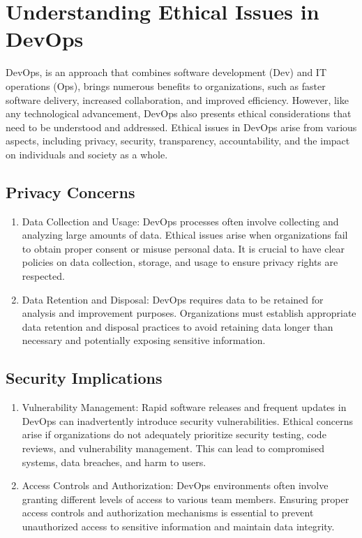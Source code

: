 \chapter*{Understanding Ethical Issues in DevOps}

DevOps, is an approach that combines software development (Dev) and IT operations (Ops), brings numerous benefits to organizations, such as faster software delivery, increased collaboration, and improved efficiency. However, like any technological advancement, DevOps also presents ethical considerations that need to be understood and addressed. Ethical issues in DevOps arise from various aspects, including privacy, security, transparency, accountability, and the impact on individuals and society as a whole.

\section*{Privacy Concerns}
\begin{enumerate}
    \item Data Collection and Usage: DevOps processes often involve collecting and analyzing large amounts of data. Ethical issues arise when organizations fail to obtain proper consent or misuse personal data. It is crucial to have clear policies on data collection, storage, and usage to ensure privacy rights are respected.

    \item Data Retention and Disposal: DevOps requires data to be retained for analysis and improvement purposes. Organizations must establish appropriate data retention and disposal practices to avoid retaining data longer than necessary and potentially exposing sensitive information.
\end{enumerate}

\section*{Security Implications}
\begin{enumerate}
    \item Vulnerability Management: Rapid software releases and frequent updates in DevOps can inadvertently introduce security vulnerabilities. Ethical concerns arise if organizations do not adequately prioritize security testing, code reviews, and vulnerability management. This can lead to compromised systems, data breaches, and harm to users.

    \item Access Controls and Authorization: DevOps environments often involve granting different levels of access to various team members. Ensuring proper access controls and authorization mechanisms is essential to prevent unauthorized access to sensitive information and maintain data integrity.
\end{enumerate}

